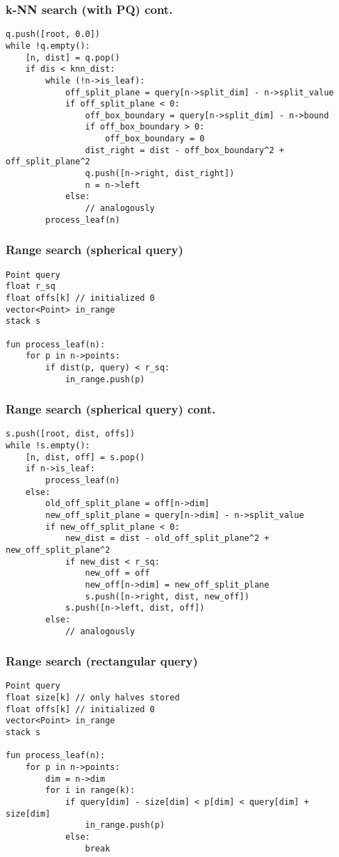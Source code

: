 \documentclass{beamer}
\begin{document}
\begin{frame}[fragile]
 \frametitle{k-NN search (with PQ) cont.}
 \begin{lstlisting}[style=CStyle]
q.push([root, 0.0])
while !q.empty():
	[n, dist] = q.pop()
	if dis < knn_dist:
		while (!n->is_leaf):
			off_split_plane = query[n->split_dim] - n->split_value
			if off_split_plane < 0:
				off_box_boundary = query[n->split_dim] - n->bound
				if off_box_boundary > 0:
					off_box_boundary = 0
				dist_right = dist - off_box_boundary^2 + off_split_plane^2
				q.push([n->right, dist_right])
				n = n->left
			else:
				// analogously
		process_leaf(n)
 \end{lstlisting}
\end{frame}

\begin{frame}[fragile]
 \frametitle{Range search (spherical query)}
 \begin{lstlisting}[style=CStyle]
Point query
float r_sq
float offs[k] // initialized 0
vector<Point> in_range
stack s

fun process_leaf(n):
	for p in n->points:
		if dist(p, query) < r_sq:
			in_range.push(p)
 \end{lstlisting}
\end{frame}

\begin{frame}[fragile]
 \frametitle{Range search (spherical query) cont.}
 \begin{lstlisting}[style=CStyle]
s.push([root, dist, offs])
while !s.empty():
	[n, dist, off] = s.pop()
	if n->is_leaf:
		process_leaf(n)
	else:
		old_off_split_plane = off[n->dim]
		new_off_split_plane = query[n->dim] - n->split_value
		if new_off_split_plane < 0:
			new_dist = dist - old_off_split_plane^2 + new_off_split_plane^2
			if new_dist < r_sq:
				new_off = off
				new_off[n->dim] = new_off_split_plane
		    	s.push([n->right, dist, new_off])
			s.push([n->left, dist, off])
		else:
			// analogously
 \end{lstlisting}
\end{frame}

\begin{frame}[fragile]
 \frametitle{Range search (rectangular query)}
  \begin{lstlisting}[style=CStyle]
Point query
float size[k] // only halves stored
float offs[k] // initialized 0
vector<Point> in_range
stack s

fun process_leaf(n):
	for p in n->points:
		dim = n->dim
		for i in range(k):
			if query[dim] - size[dim] < p[dim] < query[dim] + size[dim]
				in_range.push(p)
			else:
				break
 \end{lstlisting}
\end{frame}
\end{document}
